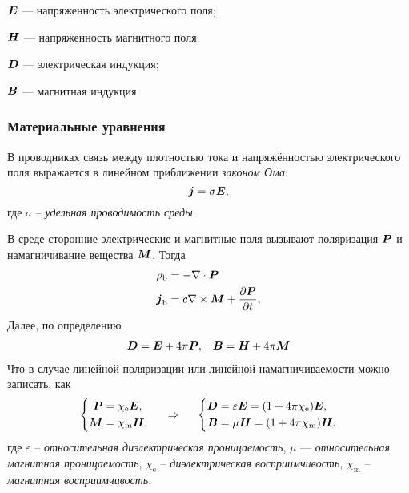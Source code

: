 \begin{description*}
    \item[$\mbox{\boldmath $E$}$]  --- напряженность электрического поля;
    \item[$\mbox{\boldmath $H$}$]  --- напряженность магнитного поля;
    \item[$\mbox{\boldmath $D$}$]  --- электрическая индукция;
    \item[$\mbox{\boldmath $B$}$]  --- магнитная индукция.
\end{description*}

\subsubsection*{Материальные уравнения}

В проводниках связь между плотностью тока и напряжённостью электрического поля выражается в линейном приближении \textit{законом Ома}:
\begin{equation*}
    \mbox{\boldmath $j$} = \sigma \mbox{\boldmath $E$},
\end{equation*}
где $\sigma$ -- \textit{удельная проводимость среды}.

В среде сторонние электрические и магнитные поля вызывают поляризация $\mbox{\boldmath $P$}$ и намагничивание вещества $\mbox{\boldmath $M$}$.
Тогда
\begin{align*}
    \rho_\text{b} &= - \nabla \cdot \mbox{\boldmath $P$} \\
    \mbox{\boldmath $j$}_\text{b} &= c \nabla \times \mbox{\boldmath $M$} + \frac{\partial \mbox{\boldmath $P$}}{\partial t} ,
\end{align*}
Далее, по определению
\begin{align*}
    \mbox{\boldmath $D$} &= \mbox{\boldmath $E$} + 4\pi \mbox{\boldmath $P$}, &\mbox{\boldmath $B$} &= \mbox{\boldmath $H$} + 4 \pi \mbox{\boldmath $M$} \\
\end{align*}
Что в случае линейной поляризации или линейной намагничиваемости можно записать, как  
$$
    \left\{\begin{aligned}
        \mbox{\boldmath $P$} &= \chi_{\text{e}} \mbox{\boldmath $E$}, \\
        \mbox{\boldmath $M$} &= \chi_{\text{m}} \mbox{\boldmath $H$}, \\
    \end{aligned}\right.
    \hspace{0.5cm} \Rightarrow \hspace{0.5cm} 
    \left\{\begin{aligned}
         \mbox{\boldmath $D$} &= \varepsilon \mbox{\boldmath $E$} = (1 + 4\pi \chi_{\text{e}}) \mbox{\boldmath $E$}, \\
       \mbox{\boldmath $B$} &= \mu \mbox{\boldmath $H$} = (1 + 4 \pi \chi_{\text{m}}) \mbox{\boldmath $H$}.
    \end{aligned}\right.
$$
где $\varepsilon$ -- \textit{относительная диэлектрическая проницаемость}, $\mu$  — \textit{относительная магнитная проницаемость}, $\chi_{\text{e}}$  -- \textit{диэлектрическая восприимчивость}, $\chi_{\text{m}}$ -- \textit{магнитная восприимчивость}.

